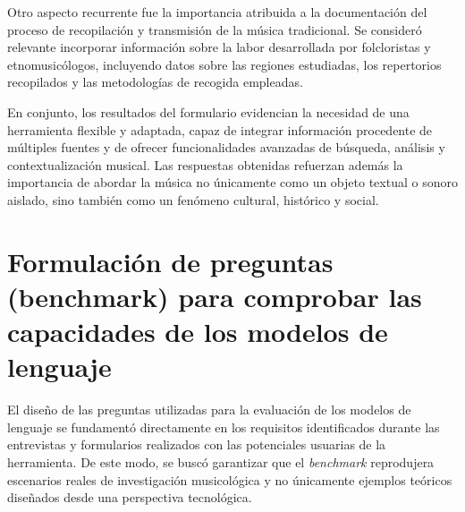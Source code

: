 Otro aspecto recurrente fue la importancia atribuida a la documentación del proceso de recopilación y transmisión de la música tradicional. Se consideró relevante incorporar información sobre la labor desarrollada por folcloristas y etnomusicólogos, incluyendo datos sobre las regiones estudiadas, los repertorios recopilados y las metodologías de recogida empleadas.

En conjunto, los resultados del formulario evidencian la necesidad de una herramienta flexible y adaptada, capaz de integrar información procedente de múltiples fuentes y de ofrecer funcionalidades avanzadas de búsqueda, análisis y contextualización musical. Las respuestas obtenidas refuerzan además la importancia de abordar la música no únicamente como un objeto textual o sonoro aislado, sino también como un fenómeno cultural, histórico y social.

\section{Formulación de preguntas (benchmark) para comprobar las capacidades de los modelos de lenguaje}



El diseño de las preguntas utilizadas para la evaluación de los modelos de lenguaje se fundamentó directamente en los requisitos identificados durante las entrevistas y formularios realizados con las potenciales usuarias de la herramienta. De este modo, se buscó garantizar que el \textit{benchmark} reprodujera escenarios reales de investigación musicológica y no únicamente ejemplos teóricos diseñados desde una perspectiva tecnológica.

